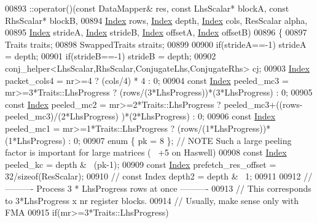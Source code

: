 \begin{DoxyCode}
00893   ::operator()(\textcolor{keyword}{const} DataMapper& res, \textcolor{keyword}{const} LhsScalar* blockA, \textcolor{keyword}{const} RhsScalar* blockB,
00894                \hyperlink{namespace_eigen_a62e77e0933482dafde8fe197d9a2cfde}{Index} rows, \hyperlink{namespace_eigen_a62e77e0933482dafde8fe197d9a2cfde}{Index} depth, \hyperlink{namespace_eigen_a62e77e0933482dafde8fe197d9a2cfde}{Index} cols, ResScalar alpha,
00895                \hyperlink{namespace_eigen_a62e77e0933482dafde8fe197d9a2cfde}{Index} strideA, \hyperlink{namespace_eigen_a62e77e0933482dafde8fe197d9a2cfde}{Index} strideB, \hyperlink{namespace_eigen_a62e77e0933482dafde8fe197d9a2cfde}{Index} offsetA, \hyperlink{namespace_eigen_a62e77e0933482dafde8fe197d9a2cfde}{Index} offsetB)
00896   \{
00897     Traits traits;
00898     SwappedTraits straits;
00899     
00900     \textcolor{keywordflow}{if}(strideA==-1) strideA = depth;
00901     \textcolor{keywordflow}{if}(strideB==-1) strideB = depth;
00902     conj\_helper<LhsScalar,RhsScalar,ConjugateLhs,ConjugateRhs> cj;
00903     \hyperlink{namespace_eigen_a62e77e0933482dafde8fe197d9a2cfde}{Index} packet\_cols4 = nr>=4 ? (cols/4) * 4 : 0;
00904     \textcolor{keyword}{const} \hyperlink{namespace_eigen_a62e77e0933482dafde8fe197d9a2cfde}{Index} peeled\_mc3 = mr>=3*Traits::LhsProgress ? (rows/(3*LhsProgress))*(3*LhsProgress) : 0;
00905     \textcolor{keyword}{const} \hyperlink{namespace_eigen_a62e77e0933482dafde8fe197d9a2cfde}{Index} peeled\_mc2 = mr>=2*Traits::LhsProgress ? peeled\_mc3+((rows-peeled\_mc3)/(2*LhsProgress)
      )*(2*LhsProgress) : 0;
00906     \textcolor{keyword}{const} \hyperlink{namespace_eigen_a62e77e0933482dafde8fe197d9a2cfde}{Index} peeled\_mc1 = mr>=1*Traits::LhsProgress ? (rows/(1*LhsProgress))*(1*LhsProgress) : 0;
00907     \textcolor{keyword}{enum} \{ pk = 8 \}; \textcolor{comment}{// NOTE Such a large peeling factor is important for large matrices (~ +5%
       on Haswell)}
00908     \textcolor{keyword}{const} \hyperlink{namespace_eigen_a62e77e0933482dafde8fe197d9a2cfde}{Index} peeled\_kc  = depth & ~(pk-1);
00909     \textcolor{keyword}{const} \hyperlink{namespace_eigen_a62e77e0933482dafde8fe197d9a2cfde}{Index} prefetch\_res\_offset = 32/\textcolor{keyword}{sizeof}(ResScalar);    
00910 \textcolor{comment}{//     const Index depth2     = depth & ~1;}
00911 
00912     \textcolor{comment}{//---------- Process 3 * LhsProgress rows at once ----------}
00913     \textcolor{comment}{// This corresponds to 3*LhsProgress x nr register blocks.}
00914     \textcolor{comment}{// Usually, make sense only with FMA}
00915     \textcolor{keywordflow}{if}(mr>=3*Traits::LhsProgress)

\end{DoxyCode}
